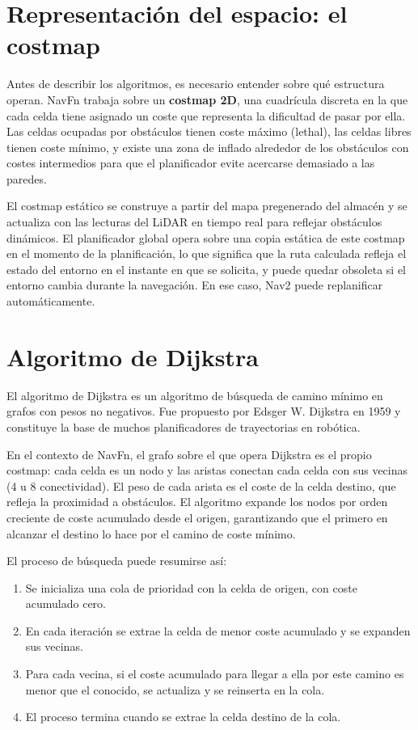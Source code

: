 \section{Representación del espacio: el costmap}

Antes de describir los algoritmos, es necesario entender sobre qué estructura operan. NavFn trabaja sobre un \textbf{costmap 2D}, una cuadrícula discreta en la que cada celda tiene asignado un coste que representa la dificultad de pasar por ella. Las celdas ocupadas por obstáculos tienen coste máximo (lethal), las celdas libres tienen coste mínimo, y existe una zona de inflado alrededor de los obstáculos con costes intermedios para que el planificador evite acercarse demasiado a las paredes.

El costmap estático se construye a partir del mapa pregenerado del almacén y se actualiza con las lecturas del LiDAR en tiempo real para reflejar obstáculos dinámicos. El planificador global opera sobre una copia estática de este costmap en el momento de la planificación, lo que significa que la ruta calculada refleja el estado del entorno en el instante en que se solicita, y puede quedar obsoleta si el entorno cambia durante la navegación. En ese caso, Nav2 puede replanificar automáticamente.

\section{Algoritmo de Dijkstra}

El algoritmo de Dijkstra\cite{dijkstra1959} es un algoritmo de búsqueda de camino mínimo en grafos con pesos no negativos. Fue propuesto por Edsger W. Dijkstra en 1959 y constituye la base de muchos planificadores de trayectorias en robótica.

En el contexto de NavFn, el grafo sobre el que opera Dijkstra es el propio costmap: cada celda es un nodo y las aristas conectan cada celda con sus vecinas (4 u 8 conectividad). El peso de cada arista es el coste de la celda destino, que refleja la proximidad a obstáculos. El algoritmo expande los nodos por orden creciente de coste acumulado desde el origen, garantizando que el primero en alcanzar el destino lo hace por el camino de coste mínimo.

El proceso de búsqueda puede resumirse así:

\begin{enumerate}
    \item Se inicializa una cola de prioridad con la celda de origen, con coste acumulado cero.
    \item En cada iteración se extrae la celda de menor coste acumulado y se expanden sus vecinas.
    \item Para cada vecina, si el coste acumulado para llegar a ella por este camino es menor que el conocido, se actualiza y se reinserta en la cola.
    \item El proceso termina cuando se extrae la celda destino de la cola.
\end{enumerate}

